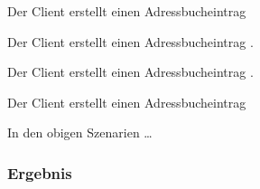 \begin{description}[leftmargin=0.7cm,style=nextline]
\item[Szenario K0:]
Der Client erstellt einen Adressbucheintrag \\
\item[Szenario K1:]
Der Client erstellt einen Adressbucheintrag .\\
\item[Szenario K2:]
Der Client erstellt einen Adressbucheintrag .\\
\item[Szenario K3:]
Der Client erstellt einen Adressbucheintrag
\end{description}
%
In den obigen Szenarien \ldots
%
%
\subsubsection*{Ergebnis}
